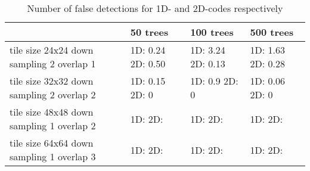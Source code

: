 \begin{table}[H]
\begin{center}
     \begin{tabular}{ | p{3cm} | p{2cm} | p{2cm} | p{2cm}|}
     \hline
      	& 50 trees & 100 trees & 500 trees \\ \hline
   	 tile size 24x24 \newline down sampling 2 \newline overlap 1 &
   	1D: 0.24  \newline 2D: 0.50 & 1D: 3.24 \newline 2D: 0.13 &  1D: 1.63 \newline 2D: 0.28  	\\ \hline
     tile size 32x32 \newline down sampling 2 \newline overlap 2 &
    1D: 0.15 \newline 2D: 0 & 1D: 0.9 \newline 2D: 0 & 1D: 0.06  \newline 2D: 0  				\\ \hline
     tile size 48x48 \newline down sampling 1 \newline overlap 2 
     & 1D: \newline 2D: & 1D: \newline 2D: & 1D: \newline 2D: 
     \\ \hline
     tile size 64x64 \newline down sampling 1 \newline overlap 3 
     & 1D: \newline 2D: & 1D: \newline 2D:  & 1D: \newline 2D: 		 \\ \hline
     \end{tabular}
\end{center}
\caption{Number of false detections for 1D- and 2D-codes respectively}
\label{tabel:falseRF}
\end{table}

